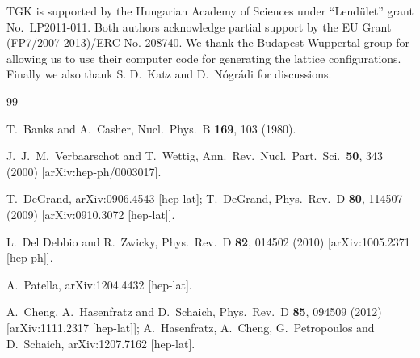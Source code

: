 \documentclass[twocolumn, prd, preprintnumbers, amsmath,
  amssymb, showpacs, floatfix]{revtex4-1}
\begin{document}
TGK is supported by the Hungarian Academy of Sciences under ``Lend\"ulet''
grant No.\ LP2011-011. Both authors acknowledge partial support by the EU
Grant (FP7/2007-2013)/ERC No. 208740. We thank the Budapest-Wuppertal group
for allowing us to use their computer code for generating the lattice
configurations. Finally we also thank S. D.\ Katz and D.\ N\'ogr\'adi for
discussions.



\begin{thebibliography}{99}

  T.~Banks and A.~Casher,
  Nucl.\ Phys.\  B {\bf 169}, 103 (1980).

  J.~J.~M.~Verbaarschot and T.~Wettig,
  Ann.\ Rev.\ Nucl.\ Part.\ Sci.\  {\bf 50}, 343 (2000)
  [arXiv:hep-ph/0003017].

  T.~DeGrand,
  arXiv:0906.4543 [hep-lat];
  T.~DeGrand,
  Phys.\ Rev.\ D {\bf 80}, 114507 (2009)
  [arXiv:0910.3072 [hep-lat]].

  L.~Del Debbio and R.~Zwicky,
  Phys.\ Rev.\ D {\bf 82}, 014502 (2010)
  [arXiv:1005.2371 [hep-ph]].

  A.~Patella,
  arXiv:1204.4432 [hep-lat].

  A.~Cheng, A.~Hasenfratz and D.~Schaich,
  Phys.\ Rev.\ D {\bf 85}, 094509 (2012)
  [arXiv:1111.2317 [hep-lat]];
  A.~Hasenfratz, A.~Cheng, G.~Petropoulos and D.~Schaich,
  arXiv:1207.7162 [hep-lat].


\end{thebibliography}
\end{document}
